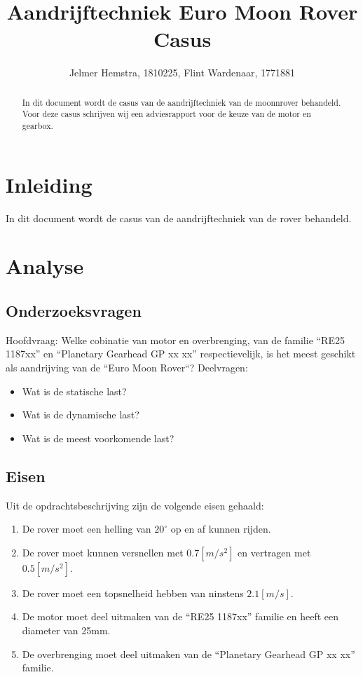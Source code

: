 \documentclass{article}
\title{Aandrijftechniek Euro Moon Rover Casus}
\author{Jelmer Hemstra, 1810225, Flint Wardenaar, 1771881}
\begin{document}
\maketitle
\newpage
\tableofcontents
\newpage
\begin{abstract}
    In dit document wordt de casus van de aandrijftechniek van de moonnrover behandeld. 
    Voor deze casus schrijven wij een adviesrapport voor de keuze van de motor en gearbox.

\end{abstract}


\section{Inleiding}
    In dit document wordt de casus van de aandrijftechniek van de rover behandeld. 


\section{Analyse}
    \subsection{Onderzoeksvragen}
        Hoofdvraag: \newline
        Welke cobinatie van motor en overbrenging, 
        van de familie ``RE25 1187xx'' en ``Planetary Gearhead GP xx xx'' respectievelijk, 
        is het meest geschikt als aandrijving van de ``Euro Moon Rover``?
        \newline \newline
        Deelvragen: 
        \begin{itemize}
            \item Wat is de statische last?
            \item Wat is de dynamische last?
            \item Wat is de meest voorkomende last?
        \end{itemize}

    \subsection{Eisen}
        Uit de opdrachtsbeschrijving zijn de volgende eisen gehaald:
        \begin{enumerate}
            \item De rover moet een helling van $20^{\circ}$ op en af kunnen rijden.
            \item De rover moet kunnen versnellen met $0.7[m/s^2]$ en vertragen met $0.5[m/s^2]$.
            \item De rover moet een topsnelheid hebben van ninstens $2.1[m/s]$.
            \item De motor moet deel uitmaken van de ``RE25 1187xx'' familie en heeft een diameter van 25mm.
            \item De overbrenging moet deel uitmaken van de ``Planetary Gearhead GP xx xx'' familie.
        \end{enumerate}
    
\end{document}
